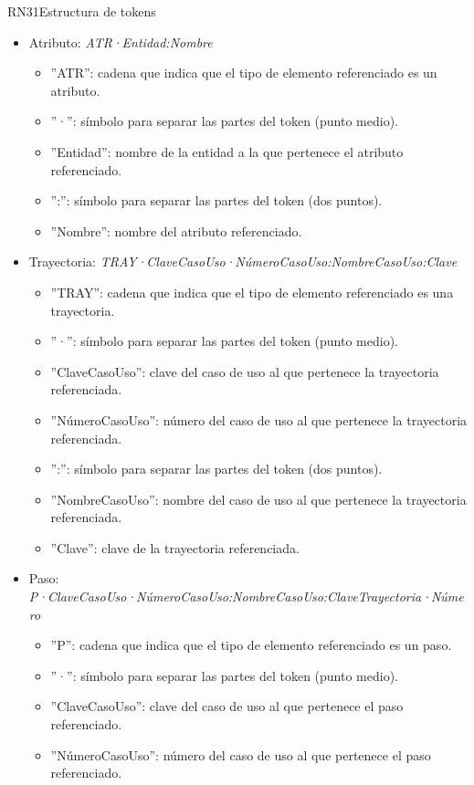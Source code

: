 \begin{BussinesRule}{RN31}{Estructura de tokens}
\begin{itemize}
\begin{itemize}
		\end{itemize}
	\item Atributo: {\em ATR·Entidad:Nombre}
		\begin{itemize}
			\item ''ATR'': cadena que indica que el tipo de elemento referenciado es un atributo.
			\item ''·'':  símbolo para separar las partes del token (punto medio).
			\item ''Entidad'': nombre de la entidad a la que pertenece el atributo referenciado.
			\item '':'': símbolo para separar las partes del token (dos puntos).
			\item ''Nombre'': nombre del atributo referenciado.
		\end{itemize}
	\item Trayectoria: {\em TRAY·ClaveCasoUso·NúmeroCasoUso:NombreCasoUso:Clave}
		\begin{itemize}
			\item ''TRAY'': cadena que indica que el tipo de elemento referenciado es una trayectoria.
			\item ''·'':  símbolo para separar las partes del token (punto medio).
			\item ''ClaveCasoUso'': clave del caso de uso al que pertenece la trayectoria referenciada.
			\item ''NúmeroCasoUso'': número del caso de uso al que pertenece la trayectoria referenciada.
			\item '':'': símbolo para separar las partes del token (dos puntos).
			\item ''NombreCasoUso'': nombre del caso de uso al que pertenece la trayectoria referenciada.
			\item ''Clave'': clave de la trayectoria referenciada.
		\end{itemize}
	\item Paso: {\em P·ClaveCasoUso·NúmeroCasoUso:NombreCasoUso:ClaveTrayectoria·Número}
		\begin{itemize}
			\item ''P'': cadena que indica que el tipo de elemento referenciado es un paso.
			\item ''·'':  símbolo para separar las partes del token (punto medio).
			\item ''ClaveCasoUso'': clave del caso de uso al que pertenece el paso referenciado.
			\item ''NúmeroCasoUso'': número del caso de uso al que pertenece el paso referenciado.

\end{itemize}
\end{itemize}
\end{BussinesRule}
